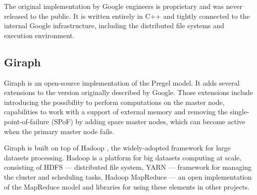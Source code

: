 The original implementation by Google engineers is proprietary and was never released to the public. It is written entirely in C++ and tightly connected to the internal Google infrastructure, including the distributed file systems and execution environment.

\subsection{Giraph}

Giraph \cite{giraph} is an open-source implementation of the Pregel model. It adds several extensions to the version originally described by Google. Those extensions include introducing the possibility to perform computations on the master node, capabilities to work with a support of external memory and removing the single-point-of-failure (SPoF) by adding spare master nodes, which can become active when the primary master node fails.

Giraph is built on top of Hadoop \cite{hadoop}, the widely-adopted framework for large datasets processing. Hadoop is a platform for big datasets computing at scale, consisting of HDFS --- distributed file system, YARN --- framework for managing the cluster and scheduling tasks, Hadoop MapReduce --- an open implementation of the MapReduce model and libraries for using these elements in other projects.
 
